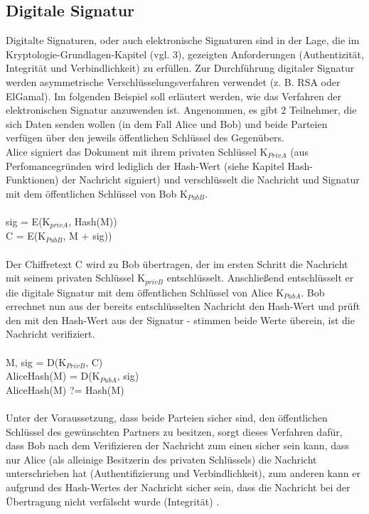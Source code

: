 \documentclass[10pt, a4paper,headsepline]{scrreprt}
\begin{document}
\subsection{Digitale Signatur}
Digitalte Signaturen, oder auch elektronische Signaturen sind in der Lage, die im Kryptologie-Grundlagen-Kapitel (vgl.  3), gezeigten Anforderungen (Authentizität, Integrität und Verbindlichkeit) zu erfüllen. Zur Durchführung digitaler Signatur werden asymmetrische Verschlüsselungsverfahren verwendet (z. B. RSA oder ElGamal). Im folgenden Beispiel soll erläutert werden, wie das Verfahren der elektronischen Signatur anzuwenden ist. Angenommen, es gibt 2 Teilnehmer, die sich Daten senden wollen (in dem Fall Alice und Bob) und beide Parteien verfügen über den jeweils öffentlichen Schlüssel des Gegenübers. \\
Alice signiert das Dokument mit ihrem privaten Schlüssel K$_{PrivA}$ (aus Perfomancegründen wird lediglich der Hash-Wert (siehe Kapitel Hash-Funktionen) der Nachricht signiert) und verschlüsselt die Nachricht und Signatur mit dem öffentlichen Schlüssel von Bob K$_{PubB}$. \\ \\
sig =  E(K$_{privA}$, Hash(M)) \\
C = E(K$_{PubB}$, M + sig)) \\ \\
Der Chiffretext C wird zu Bob übertragen, der im ersten Schritt die Nachricht mit seinem privaten Schlüssel K$_{privB}$ entschlüsselt. Anschließend entschlüsselt er die digitale Signatur mit dem öffentlichen Schlüssel von Alice K$_{PubA}$. Bob errechnet nun aus der bereits entschlüsselten Nachricht den Hash-Wert und prüft den mit den Hash-Wert aus der Signatur - stimmen beide Werte überein, ist die Nachricht verifiziert. \\ \\
M, sig = D(K$_{PrivB}$, C) \\
AliceHash(M) = D(K$_{PubA}$, sig) \\
AliceHash(M) ?= Hash(M) \\ \\
Unter der Voraussetzung, dass beide Parteien sicher sind, den öffentlichen Schlüssel des gewünschten Partners zu besitzen, sorgt dieses Verfahren dafür, dass Bob nach dem Verifizieren der Nachricht zum einen sicher sein kann, dass nur Alice (als alleinige Besitzerin des privaten Schlüssels) die Nachricht unterschrieben hat (Authentifizierung und Verbindlichkeit), zum anderen kann er aufgrund des Hash-Wertes der Nachricht sicher sein, dass die Nachricht bei der Übertragung nicht verfälscht wurde (Integrität) \citep[S. 391ff]{book:it-sicherheit}.
\end{document}
